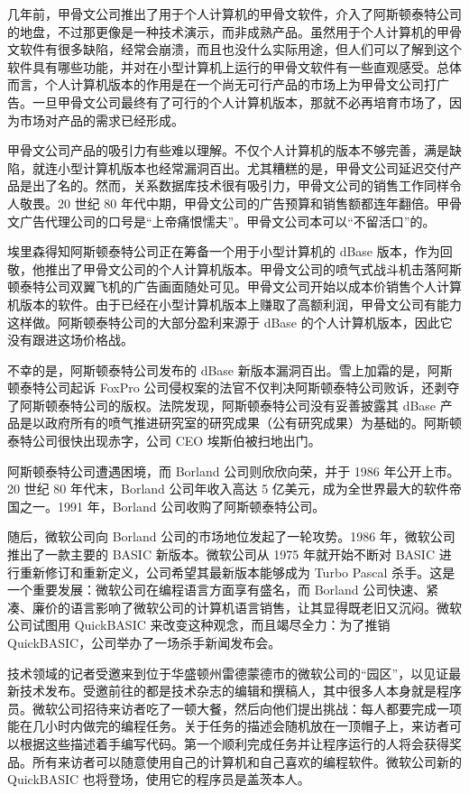 \documentclass[12pt,UTF8]{ctexbook}
\begin{document}
几年前，甲骨文公司推出了用于个人计算机的甲骨文软件，介入了阿斯顿泰特公司的地盘，不过那更像是一种技术演示，而非成熟产品。虽然用于个人计算机的甲骨文软件有很多缺陷，经常会崩溃，而且也没什么实际用途，但人们可以了解到这个软件具有哪些功能，并对在小型计算机上运行的甲骨文软件有一些直观感受。总体而言，个人计算机版本的作用是在一个尚无可行产品的市场上为甲骨文公司打广告。一旦甲骨文公司最终有了可行的个人计算机版本，那就不必再培育市场了，因为市场对产品的需求已经形成。

甲骨文公司产品的吸引力有些难以理解。不仅个人计算机的版本不够完善，满是缺陷，就连小型计算机版本也经常漏洞百出。尤其糟糕的是，甲骨文公司延迟交付产品是出了名的。然而，关系数据库技术很有吸引力，甲骨文公司的销售工作同样令人敬畏。20 世纪 80 年代中期，甲骨文公司的广告预算和销售额都连年翻倍。甲骨文广告代理公司的口号是“上帝痛恨懦夫”。甲骨文公司本可以“不留活口”的。

埃里森得知阿斯顿泰特公司正在筹备一个用于小型计算机的 dBase 版本，作为回敬，他推出了甲骨文公司的个人计算机版本。甲骨文公司的喷气式战斗机击落阿斯顿泰特公司双翼飞机的广告画面随处可见。甲骨文公司开始以成本价销售个人计算机版本的软件。由于已经在小型计算机版本上赚取了高额利润，甲骨文公司有能力这样做。阿斯顿泰特公司的大部分盈利来源于 dBase 的个人计算机版本，因此它没有跟进这场价格战。

不幸的是，阿斯顿泰特公司发布的 dBase 新版本漏洞百出。雪上加霜的是，阿斯顿泰特公司起诉 FoxPro 公司侵权案的法官不仅判决阿斯顿泰特公司败诉，还剥夺了阿斯顿泰特公司的版权。法院发现，阿斯顿泰特公司没有妥善披露其 dBase 产品是以政府所有的喷气推进研究室的研究成果（公有研究成果）为基础的。阿斯顿泰特公司很快出现赤字，公司 CEO 埃斯伯被扫地出门。

阿斯顿泰特公司遭遇困境，而 Borland 公司则欣欣向荣，并于 1986 年公开上市。20 世纪 80 年代末，Borland 公司年收入高达 5 亿美元，成为全世界最大的软件帝国之一。1991 年，Borland 公司收购了阿斯顿泰特公司。

随后，微软公司向 Borland 公司的市场地位发起了一轮攻势。1986 年，微软公司推出了一款主要的 BASIC 新版本。微软公司从 1975 年就开始不断对 BASIC 进行重新修订和重新定义，公司希望其最新版本能够成为 Turbo Pascal 杀手。这是一个重要发展：微软公司在编程语言方面享有盛名，而 Borland 公司快速、紧凑、廉价的语言影响了微软公司的计算机语言销售，让其显得既老旧又沉闷。微软公司试图用 QuickBASIC 来改变这种观念，而且竭尽全力：为了推销 QuickBASIC，公司举办了一场杀手新闻发布会。

技术领域的记者受邀来到位于华盛顿州雷德蒙德市的微软公司的“园区”，以见证最新技术发布。受邀前往的都是技术杂志的编辑和撰稿人，其中很多人本身就是程序员。微软公司招待来访者吃了一顿大餐，然后向他们提出挑战：每人都要完成一项能在几小时内做完的编程任务。关于任务的描述会随机放在一顶帽子上，来访者可以根据这些描述着手编写代码。第一个顺利完成任务并让程序运行的人将会获得奖品。所有来访者可以随意使用自己的计算机和自己喜欢的编程软件。微软公司新的 QuickBASIC 也将登场，使用它的程序员是盖茨本人。
\end{document}
